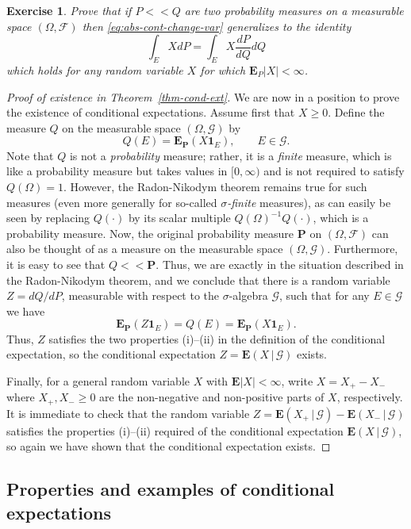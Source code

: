 \documentclass[12pt]{article}
\newtheorem{exercise}[thm]{Exercise}
\newcommand{\prob}{\mathbf{P}}
\newcommand{\expec}{\mathbf{E}}
\newcommand{\condexp}[2]{\expec\left(#1\,|\,#2\right)}
\newcommand{\ind}{\textbf{1}}
\theoremstyle{example}
\begin{document}
\begin{exercise}
Prove that if $P<<Q$ are two probability measures on a measurable space $(\Omega, \mathcal{F})$ then \eqref{eq:abs-cont-change-var} generalizes to the identity
$$
\int_E X dP = \int_E X \frac{dP}{dQ} dQ
$$
which holds for any random variable $X$ for which $\expec_P|X|<\infty$.
\end{exercise}


\begin{proof}[Proof of existence in Theorem~\ref{thm-cond-ext}] We are now in a position to prove the existence of conditional expectations. Assume first that $X\ge 0$. Define the measure $Q$ on the measurable space $(\Omega, \mathcal{G})$ by
$$ Q(E) = \expec_\prob(X \ind_E), \qquad E\in\mathcal{G}. $$
Note that $Q$ is not a \emph{probability} measure; rather, it is a \emph{finite} measure, which is like a probability measure but takes values in $[0,\infty)$ and is not required to satisfy $Q(\Omega)=1$. However, the Radon-Nikodym theorem remains true for such measures (even more generally for so-called \emph{$\sigma$-finite} measures), as can easily be seen by replacing $Q(\cdot)$ by its scalar multiple $Q(\Omega)^{-1} Q(\cdot)$, which is a probability measure.
Now, the original probability measure $\prob$ on $(\Omega, \mathcal{F})$ can also be thought of as a measure on the measurable space $(\Omega, \mathcal{G})$. Furthermore, it is easy to see that $Q << \prob$.
Thus, we are exactly in the situation described in the Radon-Nikodym theorem, and we conclude that there is a random variable $Z=dQ/dP$, measurable with respect to the $\sigma$-algebra $\mathcal{G}$, such that for any $E\in\mathcal{G}$ we have
$$ \expec_\prob(Z \ind_E) = Q(E) = \expec_\prob(X \ind_E). $$
Thus, $Z$ satisfies the two properties (i)--(ii) in the definition of the conditional expectation, so the conditional expectation $Z=\condexp{X}{\mathcal{G}}$ exists.

Finally, for a general random variable $X$ with $\expec|X|<\infty$, write $X=X_+-X_-$ where $X_+, X_-\ge 0$ are the non-negative and non-positive parts of $X$, respectively. It is immediate to check that the random variable $Z = \condexp{X_+}{\mathcal{G}}
- \condexp{X_-}{\mathcal{G}}$ satisfies the properties (i)--(ii) required of the conditional expectation $\condexp{X}{\mathcal{G}}$, so again we have shown that the conditional expectation exists.
\end{proof}


\subsection{Properties and examples of conditional expectations}
\end{document}

